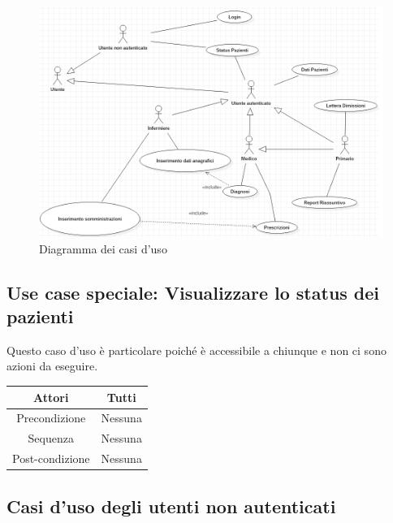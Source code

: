 \documentclass[a4paper]{report}
\begin{document}
            \begin{figure}[htbp]
                \centering
                \includegraphics[scale=0.6]{USE.png}
                \caption{Diagramma dei casi d'uso}
            \end{figure}
        
        \newpage
        \subsection{Use case speciale: Visualizzare lo status dei pazienti}
            Questo caso d'uso è particolare poiché è accessibile a chiunque e non ci sono azioni da eseguire.
            \begin{table}[htbp]
                \centering
                \begin{tabular}{|c|c|}
                    \hline
                    Attori & Tutti \\\hline
                    Precondizione & Nessuna \\\hline
                    Sequenza & Nessuna \\\hline
                    Post-condizione & Nessuna \\\hline
                \end{tabular}
        \end{table}
        
        \newpage
        \subsection{Casi d'uso degli utenti non autenticati}
\end{document}
